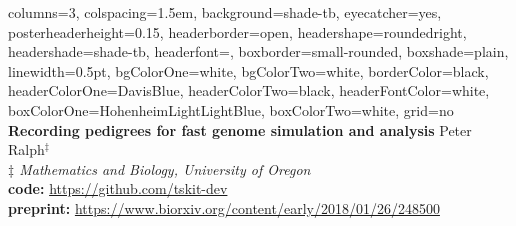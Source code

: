 \documentclass[fontscale=0.38,a0paper]{baposter}
\begin{document}
\newlength{\leftimgwidth}
\begin{poster}%
  {
  columns=3,
  colspacing=1.5em,
  background=shade-tb,
  eyecatcher=yes,
  posterheaderheight=0.15\textheight,
  headerborder=open,
  headershape=roundedright,
  headershade=shade-tb,
  headerfont=\Large\textsf, %
  boxborder=small-rounded,
  boxshade=plain,
  linewidth=0.5pt,
  bgColorOne=white,
  bgColorTwo=white,
  borderColor=black,
  headerColorOne=DavisBlue,
  headerColorTwo=black,
  headerFontColor=white,
  boxColorOne=HohenheimLightLightBlue,
  boxColorTwo=white,
  grid=no
  }
  {
  }
  {\sf %
  \vspace{0.5em}
     \textbf{\textcolor{DavisBlue}{Recording pedigrees for fast genome simulation and analysis}}\vspace{0.5em}}
  {\sf %
    Peter Ralph$^{\ddagger}$ \\  \vspace{-1.0mm}
    {\small \textit{$\ddagger$ Mathematics and Biology, University of Oregon} }\\
    {\textbf{code:}  \url{https://github.com/tskit-dev} }\\
    {\textbf{preprint:}  \url{https://www.biorxiv.org/content/early/2018/01/26/248500} }\\
  }
  {
    \makebox[15em][r]{%
      \begin{minipage}{12em}

\end{minipage}}}
\end{poster}
\end{document}
